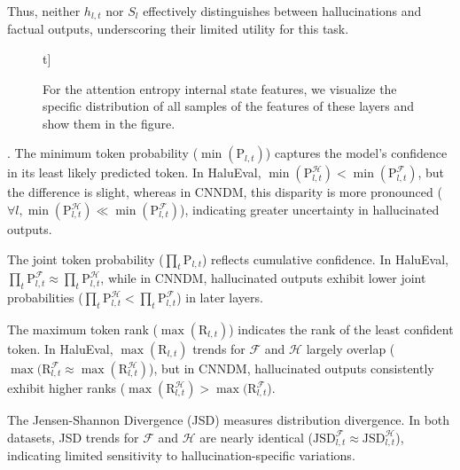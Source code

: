 Thus, neither \(h_{l,t}\) nor \(S_l\) effectively distinguishes between hallucinations and factual outputs, underscoring their limited utility for this task.

\begin{figure}t]
\centering
      \caption{
      For the attention entropy internal state features, we visualize the specific distribution of all samples of the features of these layers and show them in the figure.
      }
    \label{fig:understand:key:atten_entropy}
\end{figure}

.  
The minimum token probability (\(\min(\text{P}_{l,t})\)) captures the model's confidence in its least likely predicted token. In HaluEval, \(\min(\text{P}_{l,t}^{\mathcal{H}}) < \min(\text{P}_{l,t}^{\mathcal{F}})\), but the difference is slight, whereas in CNNDM, this disparity is more pronounced (\(\forall l, \min(\text{P}_{l,t}^{\mathcal{H}}) \ll \min(\text{P}_{l,t}^{\mathcal{F}})\)), indicating greater uncertainty in hallucinated outputs.

The joint token probability (\(\prod_t \text{P}_{l,t}\)) reflects cumulative confidence. In HaluEval, \(\prod_t \text{P}_{l,t}^{\mathcal{F}} \approx \prod_t \text{P}_{l,t}^{\mathcal{H}}\), while in CNNDM, hallucinated outputs exhibit lower joint probabilities (\(\prod_t \text{P}_{l,t}^{\mathcal{H}} < \prod_t \text{P}_{l,t}^{\mathcal{F}}\)) in later layers.

The maximum token rank (\(\max(\text{R}_{l,t})\)) indicates the rank of the least confident token. In HaluEval, \(\max(\text{R}_{l,t})\) trends for \(\mathcal{F}\) and \(\mathcal{H}\) largely overlap (\(\max(\text{R}_{l,t}^{\mathcal{F}} \approx \max(\text{R}_{l,t}^{\mathcal{H}})\)), but in CNNDM, hallucinated outputs consistently exhibit higher ranks (\(\max(\text{R}_{l,t}^{\mathcal{H}}) > \max(\text{R}_{l,t}^{\mathcal{F}}\)).

The Jensen-Shannon Divergence (JSD) measures distribution divergence. In both datasets, JSD trends for \(\mathcal{F}\) and \(\mathcal{H}\) are nearly identical (\(\text{JSD}_{l,t}^{\mathcal{F}} \approx \text{JSD}_{l,t}^{\mathcal{H}}\)), indicating limited sensitivity to hallucination-specific variations.

